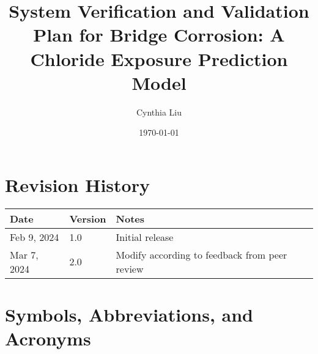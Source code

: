 \documentclass[12pt, titlepage]{article}
\begin{document}
\title{System Verification and Validation Plan for Bridge Corrosion: A Chloride Exposure Prediction Model} 
\author{Cynthia Liu}
\date{\today}
	
\maketitle


\section*{Revision History}

\begin{tabularx}{\textwidth}{p{2.5cm}p{1.5cm}X}
\toprule {\bf Date} & {\bf Version} & {\bf Notes}\\
\midrule
Feb 9, 2024 & 1.0 & Initial release\\
Mar 7, 2024 & 2.0 & Modify according to feedback from peer review\\
\bottomrule
\end{tabularx}



\newpage

\tableofcontents

\listoftables


\newpage

\section{Symbols, Abbreviations, and Acronyms}
\end{document}
